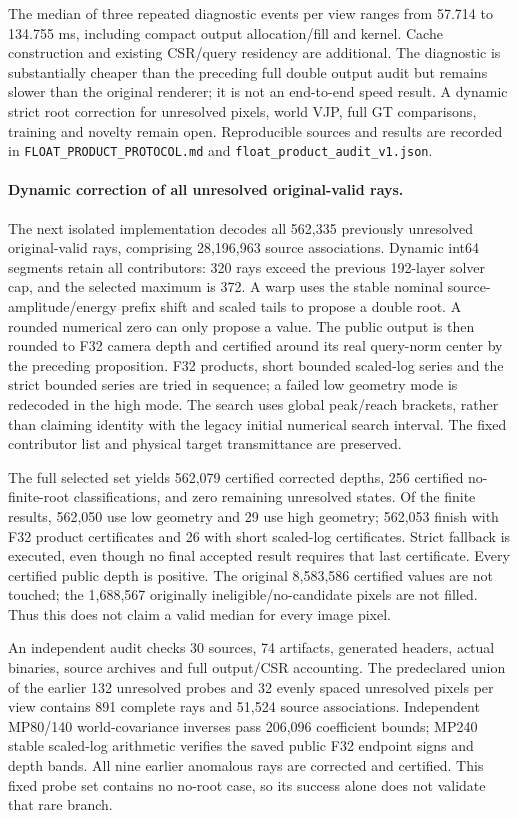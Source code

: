 \documentclass[11pt,a4paper]{article}
\begin{document}
The median of three repeated diagnostic events per view ranges from
57.714 to 134.755 ms, including compact output allocation/fill and kernel.
Cache construction and existing CSR/query residency are additional.
The diagnostic is substantially cheaper than the preceding full double
output audit but remains slower than the original renderer; it is not an
end-to-end speed result. A dynamic strict root correction for unresolved
pixels, world VJP, full GT comparisons, training and novelty remain open.
Reproducible sources and results are recorded in
\texttt{FLOAT\_PRODUCT\_PROTOCOL.md} and
\texttt{float\_product\_audit\_v1.json}.

\paragraph{Dynamic correction of all unresolved original-valid rays.}
The next isolated implementation decodes all 562,335 previously unresolved
original-valid rays, comprising 28,196,963 source associations. Dynamic
int64 segments retain all contributors: 320 rays exceed the previous
192-layer solver cap, and the selected maximum is 372. A warp uses the
stable nominal source-amplitude/energy prefix shift and scaled tails to
propose a double root. A rounded numerical zero can only propose a value.
The public output is then rounded to F32 camera depth and certified around
its real query-norm center by the preceding proposition. F32 products,
short bounded scaled-log series and the strict bounded series are tried
in sequence; a failed low geometry mode is redecoded in the high mode.
The search uses global peak/reach brackets, rather than claiming identity
with the legacy initial numerical search interval. The fixed contributor
list and physical target transmittance are preserved.

The full selected set yields 562,079 certified corrected depths, 256
certified no-finite-root classifications, and zero remaining unresolved
states. Of the finite results, 562,050 use low geometry and 29 use high
geometry; 562,053 finish with F32 product certificates and 26 with short
scaled-log certificates. Strict fallback is executed, even though no final
accepted result requires that last certificate. Every certified public
depth is positive. The original 8,583,586 certified values are not touched;
the 1,688,567 originally ineligible/no-candidate pixels are not filled.
Thus this does not claim a valid median for every image pixel.

An independent audit checks 30 sources, 74 artifacts, generated headers,
actual binaries, source archives and full output/CSR accounting. The
predeclared union of the earlier 132 unresolved probes and 32 evenly
spaced unresolved pixels per view contains 891 complete rays and 51,524
source associations. Independent MP80/140 world-covariance inverses pass
206,096 coefficient bounds; MP240 stable scaled-log arithmetic verifies
the saved public F32 endpoint signs and depth bands. All nine earlier
anomalous rays are corrected and certified. This fixed probe set contains
no no-root case, so its success alone does not validate that rare branch.
\end{document}
